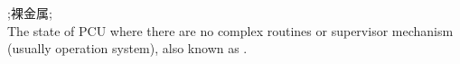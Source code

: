

;裸金属; \\
The state of PCU where there are no complex routines or supervisor mechanism (usually operation system), also known as .
